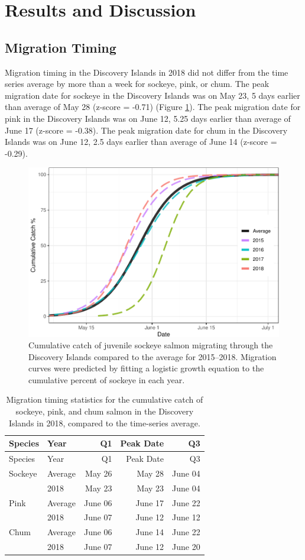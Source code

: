 \documentclass[fleqn,10pt]{wlpeerj} %
\begin{document}
\section*{Results and Discussion}\label{results-and-discussion}

\subsection*{Migration Timing}\label{migration-timing}

Migration timing in the Discovery Islands in 2018 did not differ from
the time series average by more than a week for sockeye, pink, or chum.
The peak migration date for sockeye in the Discovery Islands was on May
23, 5 days earlier than average of May 28 (z-score = -0.71) (Figure
\ref{fig:mt}). The peak migration date for pink in the Discovery Islands
was on June 12, 5.25 days earlier than average of June 17 (z-score =
-0.38). The peak migration date for chum in the Discovery Islands was on
June 12, 2.5 days earlier than average of June 14 (z-score = -0.29).

\begin{figure}[H]
\includegraphics[width=0.8\linewidth]{peer_j_migration_dynamics_files/figure-latex/mt-1} \caption{Cumulative catch of juvenile sockeye salmon migrating through the Discovery Islands compared to the average for 2015--2018. Migration curves were predicted by fitting a logistic growth equation to the cumulative percent of sockeye in each year.}\label{fig:mt}
\end{figure}

\begin{longtable}[]{@{}llrrr@{}}
\caption{\label{tab:mtdi} Migration timing statistics for the cumulative
catch of sockeye, pink, and chum salmon in the Discovery Islands in
2018, compared to the time-series average.}\tabularnewline
\toprule
Species & Year & Q1 & Peak Date & Q3\tabularnewline
\midrule
\endfirsthead
\toprule
Species & Year & Q1 & Peak Date & Q3\tabularnewline
\midrule
\endhead
Sockeye & Average & May 26 & May 28 & June 04\tabularnewline
~ & 2018 & May 23 & May 23 & June 04\tabularnewline
Pink & Average & June 06 & June 17 & June 22\tabularnewline
~ & 2018 & June 07 & June 12 & June 12\tabularnewline
Chum & Average & June 06 & June 14 & June 22\tabularnewline
~ & 2018 & June 07 & June 12 & June 20\tabularnewline
\bottomrule
\end{longtable}
\end{document}
